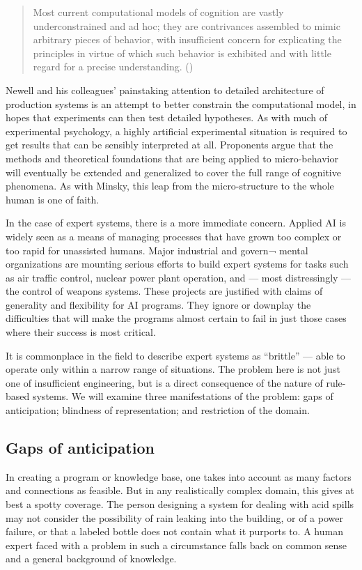 \documentclass[12pt]{article}
\def\bq{\begin{quote}}
\def\eq{\end{quote}}
\begin{document}
\bq
Most current computational models of cognition are vastly underconstrained and ad hoc; they are contrivances assembled to mimic
arbitrary pieces of behavior, with insufficient concern for explicating the principles in virtue of which such behavior is exhibited and with little regard for a precise understanding. ({\it \cite{pylyshyn1984}})
\eq

Newell and his colleagues' painstaking attention to detailed architecture of production systems is an attempt to better constrain the computational model, in hopes that experiments can then test detailed hypotheses. As with much of experimental psychology, a highly artificial experimental situation is required to get results that can be sensibly interpreted at all. Proponents argue that the methods and theoretical foundations that are being applied to micro-behavior will eventually be extended and generalized to cover the full range of cognitive phenomena. As with Minsky, this leap from the micro-structure to the whole human is one of faith.

In the case of expert systems, there is a more immediate concern. Applied AI is widely seen as a means of managing processes that have grown too complex or too rapid for unassisted humans. Major industrial and govern¬ mental organizations are mounting serious efforts to build expert systems for tasks such as air traffic control, nuclear power plant operation, and --- most distressingly --- the control of weapons systems. These projects are justified with claims of generality and flexibility for AI programs. They ignore or downplay the difficulties that will make the programs almost certain to fail in just those cases where their success is most critical.

It is commonplace in the field to describe expert systems as ``brittle'' --- able to operate only within a narrow range of situations. The problem here is not just one of insufficient engineering, but is a direct consequence of the nature of rule-based systems. We will examine three manifestations of the problem: gaps of anticipation; blindness of representation; and restriction of the domain.

\subsection{Gaps of anticipation}

In creating a program or knowledge base, one takes into account as many factors and connections as feasible. But in any realistically complex domain, this gives at best a spotty coverage. The person designing a system for dealing with acid spills may not consider the possibility of rain leaking into the building, or of a power failure, or that a labeled bottle does not contain what it purports to. A human expert faced with a problem in such a circumstance falls back on common sense and a general background of knowledge.
\end{document}
